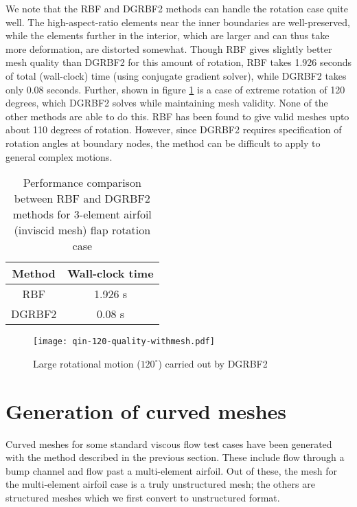  We note that the RBF and DGRBF2 methods can handle the rotation case quite well. The high-aspect-ratio elements near the inner boundaries are well-preserved, while the elements further in the interior, which are larger and can thus take more deformation, are distorted somewhat. Though RBF gives slightly better mesh quality than DGRBF2 for this amount of rotation, RBF takes 1.926 seconds of total (wall-clock) time (using conjugate gradient solver), while DGRBF2 takes only 0.08 seconds. Further, shown in figure \ref{fig:qin-dgrbf2-120} is a case of extreme rotation of 120 degrees, which DGRBF2 solves while maintaining mesh validity. None of the other methods are able to do this. RBF has been found to give valid meshes upto about 110 degrees of rotation. However, since DGRBF2 requires specification of rotation angles at boundary nodes, the method can be difficult to apply to general complex motions.
 
 \begin{table}[h!]
 	\centering
 \begin{tabular}{|c|c|}
 	\hline
 	Method & Wall-clock time \\
 	\hline
 	RBF   &   1.926 s \\
 	DGRBF2 &  0.08 s \\
 	\hline
 \end{tabular}
 \caption{Performance comparison between RBF and DGRBF2 methods for 3-element airfoil (inviscid mesh) flap rotation case}
 \end{table}
 
 \begin{figure}
 	\centering
 	\texttt{[image: qin-120-quality-withmesh.pdf]}
 	\caption{Large rotational motion ($120^\circ$) carried out by DGRBF2}
 	\label{fig:qin-dgrbf2-120}
 \end{figure}
 
 \FloatBarrier
 
 \section{Generation of curved meshes}
 
 Curved meshes for some standard viscous flow test cases have been generated with the method described in the previous section. These include flow through a bump channel and flow past a multi-element airfoil. Out of these, the mesh for the multi-element airfoil case is a truly unstructured mesh; the others are structured meshes which we first convert to unstructured format.
 
